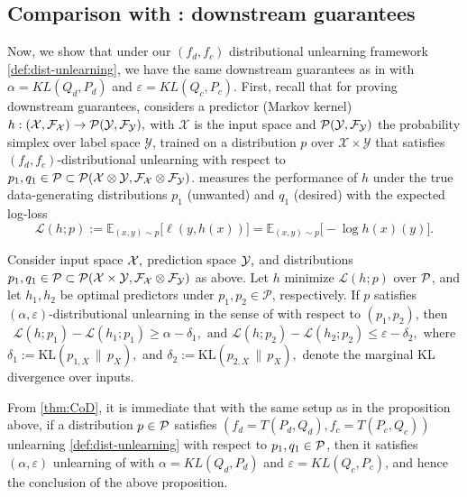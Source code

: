 \subsection{Comparison with \citet{allouah2025distributionalmachineunlearningselective}: downstream guarantees}
 Now, we show that under our $(f_d,f_c)$ distributional unlearning framework \ref{def:dist-unlearning}, we have the same downstream guarantees as in \citet[Proposition 2]{allouah2025distributionalmachineunlearningselective} with $\alpha= KL(Q_d,P_d)$ and $\varepsilon= KL(Q_c,P_c)$. First,  recall that for proving downstream guarantees, \citet{allouah2025distributionalmachineunlearningselective} considers a predictor (Markov kernel)  $h:(\mathcal{X}, \mathcal{F}_{\mathcal{X}}) \to \mathcal{P}(\mathcal{Y}, \mathcal{F}_{\mathcal{Y}}),$ with \(\mathcal X\) is the input space and \(\mathcal{P}(\mathcal{Y}, \mathcal{F}_{\mathcal{Y}})\) the probability simplex over label space \(\mathcal Y\), trained on a
distribution \(p\) over \(\mathcal X\times\mathcal Y\) that satisfies \((f_d,f_c)\)-distributional unlearning with respect to $p_1,q_1\in \mathcal{P} \subset \mathcal{P}(\mathcal{X} \otimes \mathcal{Y}, \mathcal{F}_{\mathcal{X}}\otimes \mathcal{F}_{\mathcal{Y}})$. \citet{allouah2025distributionalmachineunlearningselective} measures the performance of \(h\) under the true data-generating distributions \(p_1\) (unwanted) and \(q_1\) (desired) with the expected log-loss 
\begin{equation}
    \mathcal L(h;p)
    :=
    \mathbb 
    E_{(x,y)\sim p}\bigl[\ell(y,h(x))\bigr]
    =
    \mathbb 
    E_{(x,y)\sim p}\bigl[-\log h(x)(y)\bigr]
    .
\end{equation}

\begin{proposition}\cite[Proposition 2]{allouah2025distributionalmachineunlearningselective} \label{lem:DG} Consider input space $\mathcal{X},$ prediction space $\mathcal{Y},$ and distributions $ p_1,q_1 \in \mathcal{P} \subset \mathcal{P}(\mathcal{X}\times \mathcal{Y}, \mathcal{F}_{\mathcal{X}}\otimes \mathcal{F}_{\mathcal{Y}})$ as above.  Let \(h\) minimize \(\mathcal L(h;p)\) over $\mathcal{P}$, and let \(h_1,h_2\) be optimal
predictors under \(p_1,p_2\in\mathcal P\), respectively. If \(p\)
satisfies \((\alpha,\varepsilon)\)-distributional unlearning in the sense of \citet{allouah2025distributionalmachineunlearningselective} with respect
to \((p_1,p_2)\), then
\begin{equation}
    \mathcal L(h;p_1)-\mathcal L(h_1;p_1)
    \geq
    \alpha-\delta_1,
    \text{ and }
    \mathcal L(h;p_2)-\mathcal L(h_2;p_2)
    \leq
    \varepsilon-\delta_2, \text{ where}
\end{equation}
$\delta_1 := \mathrm{KL}(p_{1,X}\,\|\,p_X),$ and $ \delta_2 := \mathrm{KL}(p_{2,X}\,\|\,p_X),$
denote the marginal KL divergence over inputs.
\end{proposition}
\begin{remark}
    From \ref{thm:CoD}, it is immediate that with the same setup as in the proposition above, if a distribution $p\in \mathcal{P}$ satisfies $(f_d=T(P_d,Q_d),f_c=T(P_c,Q_c))$ unlearning \ref{def:dist-unlearning} with respect to $p_1,q_1\in \mathcal{P}$, then it satisfies $(\alpha, \varepsilon)$ unlearning of \citet{allouah2025distributionalmachineunlearningselective} with $\alpha = KL(Q_d,P_d)$ and $\varepsilon =KL(Q_c,P_c)$, and hence the conclusion of the above proposition. 
\end{remark}
